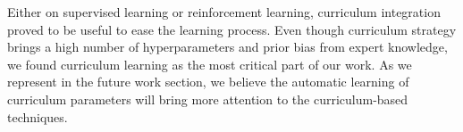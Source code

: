 Either on supervised learning or reinforcement learning, curriculum integration proved to be useful to ease the learning process. Even though curriculum strategy brings a high number of hyperparameters and prior bias from expert knowledge, we found curriculum learning as the most critical part of our work. As we represent in the future work section, we believe the automatic learning of curriculum parameters will bring more attention to the curriculum-based techniques.
